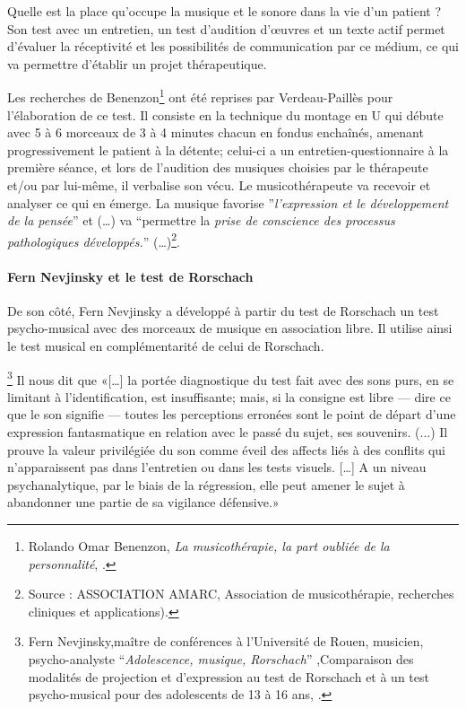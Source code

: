 Quelle est la place qu'occupe la musique et le sonore dans la vie d'un patient ? Son test avec un entretien, un test d'audition d'\oe uvres et un texte actif permet d'évaluer la réceptivité et les possibilités de communication par ce médium, ce qui va permettre d'établir un projet thérapeutique.

Les recherches de Benenzon\footnote{Rolando Omar
  Benenzon, \emph{La musicothérapie, la part oubliée de la
    personnalité}, \cite{Benenzon2007}.} ont été reprises par
Verdeau-Paillès pour l'élaboration de ce test. Il consiste en la technique du montage en U qui débute avec 5 à 6 morceaux de 3 à 4 minutes chacun en fondus enchaînés, amenant progressivement le patient à la détente; celui-ci a un entretien-questionnaire à la première
séance, et lors de l'audition des musiques choisies par le thérapeute
et/ou par lui-même, il  verbalise son vécu. Le musicothérapeute
va recevoir et analyser ce qui en émerge. 
La musique favorise  ''\emph{l'expression et le développement
	de la pensée}'' et (\ldots) va ``permettre la \emph{prise de conscience
	des processus pathologiques développés.}''
  (\ldots)\footnote{Source : ASSOCIATION AMARC,
  Association de musicothérapie, recherches cliniques et
  applications). }.


 \paragraph{Fern Nevjinsky et le test de Rorschach}
 De son côté, Fern Nevjinsky a développé à partir du  test de Rorschach un test psycho-musical avec des morceaux
de musique en association libre. Il utilise ainsi le test
musical en complémentarité de celui de Rorschach.

 
\footnote{Fern Nevjinsky,maître de conférences à l'Université de Rouen, musicien, psycho-analyste ``\emph{Adolescence, musique, Rorschach}'' ,Comparaison des modalités de projection et d'expression au test de Rorschach et à un test psycho-musical pour des adolescents de 13 à 16 ans,
  \cite{Nevjinsky1996}.} Il nous dit  que  «[\ldots] la
portée diagnostique du test fait avec des sons purs, en se limitant à
l'identification, est insuffisante; mais, si la consigne est libre ---
dire ce que le son signifie --- toutes les perceptions erronées sont
le point de départ d'une expression fantasmatique en relation avec le
passé du sujet, ses souvenirs. (...) Il prouve  la valeur privilégiée du son comme éveil
des affects liés à des conflits qui n'apparaissent pas dans
l'entretien ou dans les tests visuels.  [\ldots] A un niveau
psychanalytique, par le biais de la régression, elle peut amener le sujet à abandonner une partie de sa vigilance défensive.»


